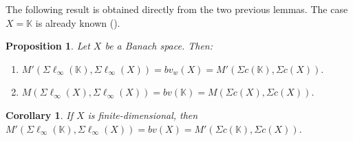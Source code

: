 \documentclass[14pt, a4paper]{article}  %
\providecommand{\pare}[1]{\left( #1\right) }
\newcommand{\K}{\mathbb{K}}
\newtheorem{corollary}{Corollary}[section]
\newtheorem{proposition}{Proposition}[section]
\begin{document}
 
	
	The following result is obtained directly from the two previous lemmas. The case $X = \K$ is already known (\cite[Thm. 7.3.5]{Wil}).
	\begin{proposition}\label{final9}
		Let $X$ be a Banach space. Then:
		\begin{enumerate}
			\item[i.] $M'\pare{\Sigma \ell_{\infty}\pare{\K},\Sigma \ell_{\infty}\pare{X}}
			=
			bv_w(X)=M'\pare{\Sigma c\pare{\K},\Sigma c\pare{X}}.$
			\item[ii.] $M\pare{\Sigma \ell_{\infty}\pare{X},\Sigma \ell_{\infty}\pare{X}}
			=
			bv\pare{\K}=M\pare{\Sigma c\pare{X},\Sigma c\pare{X}}$.  
		\end{enumerate} 
	\end{proposition}
	

	
		\begin{corollary}
		If $X$ is finite-dimensional, then $M'\pare{\Sigma \ell_{\infty}\pare{\K},\Sigma \ell_{\infty}\pare{X}}
		=
		bv(X)=M'\pare{\Sigma c\pare{\K},\Sigma c\pare{X}}.$
	\end{corollary}
	
	  
	
\end{document}

